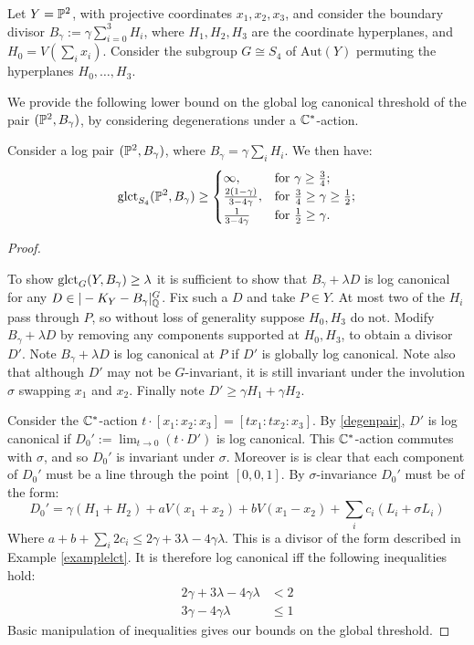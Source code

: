 Let \(Y = \mathbb{P}^2\), with projective coordinates \(x_1,x_2,x_3\), and consider the boundary divisor \(B_\gamma  := \gamma \sum_{i=0}^3  H_i\), where \(H_1,H_2,H_3\) are the coordinate hyperplanes, and \(H_0 = V (\sum_i x_i) \). Consider the subgroup \(G \cong S_4\) of \(\text{Aut}(Y)\) permuting the hyperplanes \(H_0,\dots,H_3\).

We provide the following lower bound on the global log canonical threshold of the pair \((\mathbb{P}^2,B_\gamma)\), by considering degenerations under a \(\mathbb{C}^*\)-action. 
\begin{lemma}\label{lem:alph}
Consider a log pair \((\mathbb{P}^2,B_\gamma)\), where \(B_\gamma = \gamma \sum_i H_i\). We then have:
\[
\operatorname{glct}_{S_4}(\mathbb{P}^2, B_\gamma) \ge
\begin{cases}
\infty, & \text{for } \gamma \ge \frac{3}{4};\\
\frac{2(1-\gamma)}{3-4\gamma}, & \text{for } \frac{3}{4} \ge \gamma \ge \frac{1}{2};\\
\frac{1}{3-4 \gamma} & \text{for } \frac{1}{2} \ge \gamma.
\end{cases}
\]
\end{lemma}
\begin{proof} \

To show \(\operatorname{glct}_{G}(Y,B_\gamma) \ge \lambda\) it is sufficient to show that \(B_\gamma+\lambda D\) is log canonical for any \( D \in |-K_Y - B_\gamma|_{\mathbb{Q}}^G\). Fix such a \(D\) and take \(P \in Y\). At most two of the \(H_i\) pass through \(P\), so without loss of generality suppose \(H_0,H_3\) do not. Modify \(B_\gamma+\lambda D\) by removing any components supported at \(H_0,H_3\), to obtain a divisor \(D'\). Note \(B_\gamma+\lambda D\) is log canonical at \(P\) if \(D'\) is globally log canonical. Note also that although \(D'\) may not be \(G\)-invariant, it is still invariant under the involution \(\sigma \) swapping \(x_1\) and \(x_2\). Finally note \(D' \ge \gamma H_1 + \gamma H_2\).

Consider the \(\mathbb{C}^*\)-action \(t \cdot [x_1:x_2:x_3] = [ t x_1: t x_2 : x_3]\). By \ref{degenpair}, \(D'\) is log canonical if \(D_0' := \lim_{t \to 0} \left( t \cdot D' \right) \) is log canonical. This \(\mathbb{C}^*\)-action commutes with \(\sigma \), and so \(D_0'\) is invariant under \(\sigma\). Moreover is is clear that each component of \(D_0'\) must be a line through the point \([0,0,1]\). By \(\sigma\)-invariance \(D_0'\) must be of the form:
\[
D_0' = \gamma (H_1+H_2) + a V (x_1+x_2) + b V(x_1-x_2) + \sum_i c_i (L_i + \sigma L_i)
\]
Where \(a + b + \sum_i 2 c_i \le 2 \gamma + 3\lambda - 4 \gamma \lambda\). This is a divisor of the form described in Example \ref{examplelct}. It is therefore log canonical iff the following inequalities hold:
\begin{align*}
2\gamma + 3 \lambda - 4\gamma \lambda &< 2 \\
3\gamma - 4\gamma \lambda &\le 1
\end{align*}
Basic manipulation of inequalities gives our bounds on the global threshold.
\end{proof}
